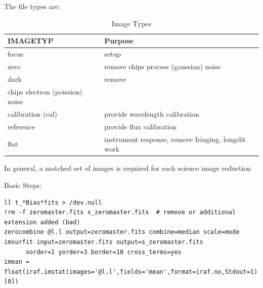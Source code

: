 The file types are:

\begin{table}[h!]
\centering
\begin{tabular}{| l | l |}
\hline
IMAGETYP  & Purpose   \\
\hline
focus             & setup    \\ 
zero              & remove chips process (gaussian) noise    \\ 
dark              & remove  \\
chips electron (poission) noise    \\ 
calibration (cal) & provide wavelength calibration    \\ 
reference         & provide flux calibration    \\ 
flat              & instrument response, remove fringing, longslit work    \\ 
\hline
\end{tabular}
\caption[TOC]{Image Types}
\label{table:ImageTypes}
\end{table}

\newpage
In general, a matched set of images is required for each science image
reduction

Basic Steps:

\begingroup \fontsize{10pt}{10pt}
\selectfont
\begin{verbatim} 
ll t_*Bias*fits > /dev.null
!rm -f zeromaster.fits s_zeromaster.fits  # remove or additional extension added (bad)
zerocombine @l.l output=zeromaster.fits combine=median scale=mode
imsurfit input=zeromaster.fits output=s_zeromaster.fits 
      xorder=1 yorder=3 border=10 cross_terms=yes
imean = float(iraf.imstat(images='@l.l',fields='mean',format=iraf.no,Stdout=1)[0])
\end{verbatim}
\endgroup


